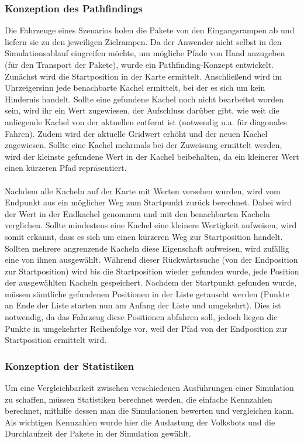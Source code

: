 \subsubsection{Konzeption des Pathfindings}
Die Fahrzeuge eines Szenarios holen die Pakete von den Eingangsrampen ab und liefern sie zu den jeweiligen Zielrampen. Da der Anwender nicht selbst in den Simulationsablauf eingreifen möchte, um mögliche Pfade von Hand anzugeben (für den Transport der Pakete), wurde ein Pathfinding-Konzept entwickelt. Zunächst wird die Startposition in der Karte ermittelt. Anschließend wird im Uhrzeigersinn jede benachbarte Kachel ermittelt, bei der es sich um kein Hindernis handelt. Sollte eine gefundene Kachel noch nicht bearbeitet worden sein, wird ihr ein Wert zugewiesen, der  Aufschluss darüber gibt, wie weit die anliegende Kachel von der aktuellen entfernt ist (notwendig u.a. für diagonales Fahren). Zudem wird der aktuelle Gridwert erhöht und der neuen Kachel zugewiesen. Sollte eine Kachel mehrmals bei der Zuweisung ermittelt werden, wird der kleinste gefundene Wert in der Kachel beibehalten, da ein kleinerer Wert einen kürzeren Pfad repräsentiert.
\\\\
Nachdem alle Kacheln auf der Karte mit Werten versehen wurden, wird vom Endpunkt aus ein möglicher Weg zum Startpunkt zurück berechnet. Dabei wird der Wert in der Endkachel genommen und mit den benachbarten Kacheln verglichen. Sollte mindestens eine Kachel eine kleinere Wertigkeit aufweisen, wird somit erkannt, dass es sich um einen kürzeren Weg zur Startposition handelt. Sollten mehrere angrenzende Kacheln diese Eigenschaft aufweisen, wird zufällig eine von ihnen ausgewählt. Während dieser Rückwärtssuche (von der Endposition zur Startposition)
wird bis die Startposition wieder gefunden wurde, jede Position der ausgewählten Kacheln gespeichert. Nachdem der Startpunkt gefunden wurde, müssen sämtliche gefundenen Positionen in der Liste getauscht werden (Punkte an Ende der Liste starten nun am Anfang der Liste und umgekehrt).
Dies ist notwendig, da das Fahrzeug diese Positionen abfahren soll, jedoch liegen die Punkte in umgekehrter Reihenfolge vor, weil der Pfad von der Endposition zur Startposition ermittelt wird.

\subsubsection{Konzeption der Statistiken}
Um eine Vergleichbarkeit zwischen verschiedenen Ausführungen einer Simulation zu schaffen, müssen Statistiken berechnet werden, die einfache Kennzahlen berechnet, mithilfe dessen man die Simulationen bewerten und vergleichen kann. Als wichtigen Kennzahlen wurde hier die Auslastung der Volksbots und die Durchlaufzeit der Pakete in der Simulation gewählt.

